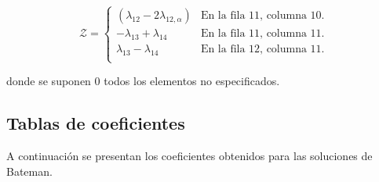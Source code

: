 \begin{equation}
	\mathcal{Z}=\begin{cases}
		(\lambda_{12}-2\lambda_{12, \alpha}) & \textrm{En la fila 11, columna 10.}\\
		-\lambda_{13}+\lambda_{14} & \textrm{En la fila 11, columna 11.}\\
		\lambda_{13}-\lambda_{14}  & \textrm{En la fila 12, columna 11.}\\
	\end{cases}
\end{equation}\label{matriz_estocastica_z}

\noindent donde se suponen 0 todos los elementos no especificados.

\subsection{Tablas de coeficientes}
A continuación se presentan los coeficientes obtenidos para las soluciones de Bateman. 
